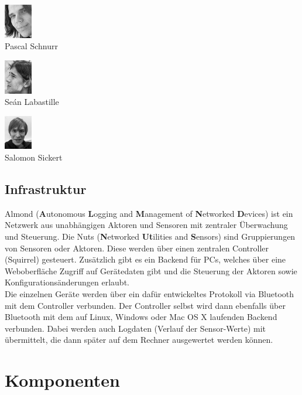 \documentclass[12pt,a4paper]{article}
\begin{document}
\begin{multicols}{2}
{\begin{list}{ }
	\item    \includegraphics[height=1.5cm]{./face_Schnurrrr.png}  \\      Pascal Schnurr    
	\item    \includegraphics[height=1.5cm]{./face_Schon.png}      \\      Seán Labastille   
	\item    \includegraphics[height=1.5cm]{./face_Sickert.png}    \\      Salomon Sickert
\end{list}
}
\end{multicols}

\subsection{Infrastruktur}
Almond ({\bf A}utonomous {\bf L}ogging and {\bf M}anagement of {\bf N}etworked {\bf D}evices) ist ein Netzwerk aus unabhängigen Aktoren und Sensoren mit zentraler Überwachung und Steuerung.
Die Nuts ({\bf N}etworked {\bf Ut}ilities and {\bf S}ensors) sind Gruppierungen von Sensoren oder Aktoren. Diese werden über einen zentralen Controller (Squirrel) gesteuert. Zusätzlich gibt es ein Backend für PCs, welches über eine Weboberfläche Zugriff auf Gerätedaten gibt und die Steuerung der Aktoren sowie Konfigurationsänderungen erlaubt.\\
Die einzelnen Geräte werden über ein dafür entwickeltes Protokoll via Bluetooth mit dem Controller verbunden. Der Controller selbst wird dann ebenfalls über Bluetooth mit dem auf Linux, Windows oder Mac OS X laufenden Backend verbunden. Dabei werden auch Logdaten (Verlauf der Sensor-Werte) mit übermittelt, die dann später auf dem Rechner ausgewertet werden können.
\section{Komponenten}
\end{document}
